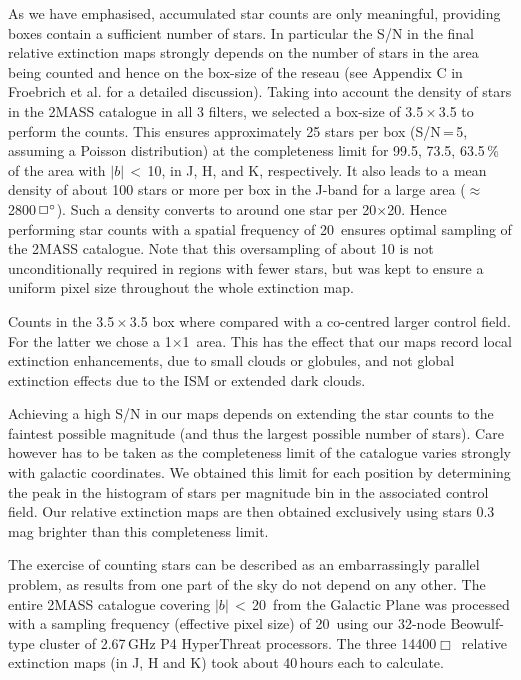 \documentclass{aa}
\begin{document}
As we have emphasised, accumulated star counts are only meaningful, providing
boxes contain a sufficient number of stars. In particular the S/N in the final
relative extinction maps strongly depends on the number of stars in the area
being counted and hence on the box-size of the reseau (see Appendix C in
Froebrich et al. \cite{2005A&A.in.press.F} for a detailed discussion). Taking
into account the density of stars in the 2MASS catalogue in all 3 filters, we
selected a box-size of 3\arcmin$\!\!$.5\,$\times$\,3\arcmin$\!\!$.5 to perform
the counts. This ensures approximately 25 stars per box (S/N\,=\,5, assuming a
Poisson distribution) at the completeness limit for 99.5, 73.5, 63.5\,\% of the
area with $|b|$\,$<$\,10\degr, in J, H, and K, respectively. It also leads to a
mean density of about 100 stars or more per box in the J-band for a large area
($\approx$\,2800\,$\Box\hbox{$^\circ$}$). Such a density converts to around one star per
20\arcsec$\times$20\arcsec. Hence performing star counts with a spatial
frequency of 20\arcsec\, ensures optimal sampling of the 2MASS catalogue. Note
that this oversampling of about 10 is not unconditionally required in regions
with fewer stars, but was kept to ensure a uniform pixel size throughout the
whole extinction map.

Counts in the 3\arcmin$\!\!$.5\,$\times$\,3\arcmin$\!\!$.5 box where compared
with a co-centred larger control field. For the latter we chose a
1\degr$\times$1\degr\, area. This has the effect that our maps record local
extinction enhancements, due to small clouds or globules, and not global
extinction effects due to the ISM or extended dark clouds.

Achieving a high S/N in our maps depends on extending the star counts to the
faintest possible magnitude (and thus the largest possible number of stars).
Care however has to be taken as the completeness limit of the catalogue varies
strongly with galactic coordinates. We obtained this limit for each position by
determining the peak in the histogram of stars per magnitude bin in the 
associated control field. Our relative extinction maps are then obtained
exclusively using stars 0.3\,mag brighter than this completeness limit.

The exercise of counting stars can be described as an embarrassingly parallel 
problem, as results from one part of the sky do not depend on any other. The
entire 2MASS catalogue covering $|b|$\,$<$\,20\degr\, from the Galactic Plane 
was processed with a sampling frequency (effective pixel size) of 20\arcsec\,
using our 32-node Beowulf-type cluster of 2.67\,GHz P4 HyperThreat processors.
The three 14400$\Box$\degr\, relative extinction maps (in J, H and K) took
about 40\,hours each to calculate. 
\end{document}
